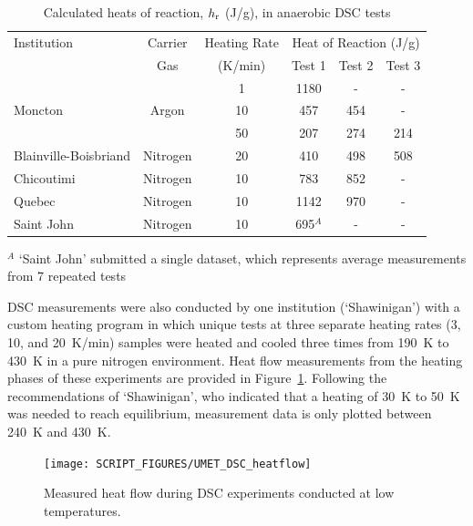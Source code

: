 \documentclass{book}
\begin{document}
\newpage
\begin{table}[h]
\caption{Calculated heats of reaction, $h_{\rm r}$ (J/g), in anaerobic DSC tests}
\label{Table_11}
\begin{center}
\begin{tabular}{|l|c|c|ccc|}
\hline
Institution           & Carrier     & Heating Rate         & \multicolumn{3}{|c|}{Heat of Reaction (J/g)} \\ \cline{4-6}
                      & Gas         & (K/min)              & Test 1  & Test 2  & Test 3                 \\ \hline
                      &             & 1                    & 1180    & -       & -                      \\
Moncton               & Argon       & 10                   & 457     & 454     & -                      \\
                      &             & 50                   & 207     & 274     & 214                    \\ \hline
Blainville-Boisbriand & Nitrogen    & 20                   & 410     & 498     & 508                    \\ \hline
Chicoutimi            & Nitrogen    & 10                   & 783     & 852     & -                      \\ \hline
Quebec                & Nitrogen    & 10                   & 1142    & 970     & -                      \\ \hline
Saint John            & Nitrogen    & 10                   & 695$^A$ & -       & -                      \\ \hline
\end{tabular}
\end{center}
$^A$ `Saint John' submitted a single dataset, which represents average measurements from 7 repeated tests
\end{table}

DSC measurements were also conducted by one institution (‘Shawinigan’) with a custom heating program in which unique tests at three separate heating rates (3, 10, and 20~K/min) samples were heated and cooled three times from 190~K to 430~K in a pure nitrogen environment. Heat flow measurements from the heating phases of these experiments are provided in Figure~\ref{Fig:UMET_DSC_heatflow}. Following the recommendations of ‘Shawinigan’, who indicated that a heating of 30~K to 50~K was needed to reach equilibrium, measurement data is only plotted between 240~K and 430~K.

\begin{figure}[h]
  \centering
  \texttt{[image: SCRIPT\_FIGURES/UMET\_DSC\_heatflow]}
  \caption{Measured heat flow during DSC experiments conducted at low temperatures.}
  \label{Fig:UMET_DSC_heatflow}
\end{figure}
\end{document}
